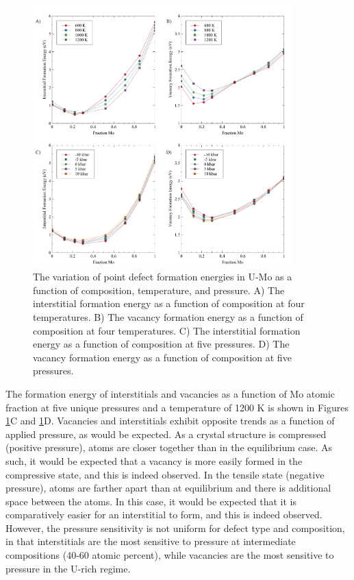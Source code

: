 \documentclass[review]{elsarticle}
\providecommand{\DIFaddend}{\protect\color{black}} %
\DeclareRobustCommand{\DIFaddend}{\DIFOaddend \let\includegraphics\DIFOincludegraphics} %
\begin{document}
\DIFaddend \begin{figure}[h!]
\centering
\includegraphics[width=0.9\textwidth]{figA.pdf}
\caption{The variation of point defect formation energies in U-Mo as a function of composition, temperature, and pressure. A) The interstitial formation energy as a function of composition at four temperatures. B) The vacancy formation energy as a function of composition at four temperatures. C) The interstitial formation energy as a function of composition at five pressures. D) The vacancy formation energy as a function of composition at five pressures.} 
\label{fig:A}
\end{figure}

The formation energy of interstitials and vacancies as a function of Mo atomic fraction at five unique pressures and a temperature of 1200 K is shown in Figures \ref{fig:A}C and \ref{fig:A}D. Vacancies and interstitials exhibit opposite trends as a function of applied pressure, as would be expected. As a crystal structure is compressed (positive pressure), atoms are closer together than in the equilibrium case. As such, it would be expected that a vacancy is more easily formed in the compressive state, and this is indeed observed. In the tensile state (negative pressure), atoms are farther apart than at equilibrium and there is additional space between the atoms. In this case, it would be expected that it is comparatively easier for an interstitial to form, and this is indeed observed. However, the pressure sensitivity is not uniform for defect type and composition, in that interstitials are the most sensitive to pressure at intermediate compositions (40-60 atomic percent), while vacancies are the most sensitive to pressure in the U-rich regime. 
\end{document}
